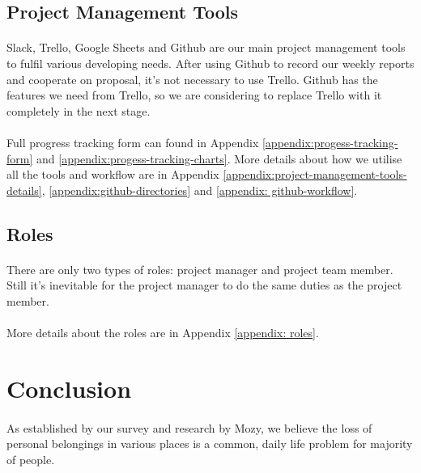 \documentclass[12pt,a4paper]{article}
\begin{document}
      \subsection{Project Management Tools}
        \paragraph{}
          Slack, Trello, Google Sheets and Github are our main project management tools to fulfil various developing needs. After using Github to record our weekly reports and cooperate on proposal, it's not necessary to use Trello. Github has the features we need from Trello, so we are considering to replace Trello with it completely in the next stage. 
        \paragraph{}
          Full progress tracking form can found in Appendix \ref{appendix:progess-tracking-form} and \ref{appendix:progess-tracking-charts}. More details about how we utilise all the tools and workflow are in Appendix \ref{appendix:project-management-tools-details}, \ref{appendix:github-directories} and \ref{appendix: github-workflow}.
      \subsection{Roles}
        \paragraph{}
          There are only two types of roles: project manager and project team member. Still it's inevitable for the project manager to do the same duties as the project member.
        \paragraph{}
          More details about the roles are in Appendix \ref{appendix: roles}.

    \section{Conclusion}
      \paragraph{}
      As established by our survey and research by Mozy, we believe the loss of personal belongings in various places is a common, daily life problem for majority of people.
\end{document}
